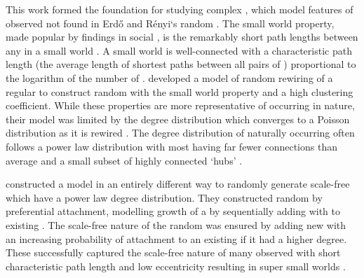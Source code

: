 This work formed the foundation for studying complex  \citep{vanSteen2010}, which model features of observed  not found in Erd\H{o} and R\'enyi`s random  \citep{Erdos1959, Erdos1960}. The \gls{small world} property, made popular by findings in social  \citep{Travers1969}, is the remarkably short path lengths between any  in a \gls{small world} . A \gls{small world}  is well-connected with a characteristic path length (the average length of \glspl{shortest path} between all pairs of ) proportional to the logarithm of the number of . \citet{Watts1998} developed a model of random rewiring of a regular  to construct random  with the \gls{small world} property and a high clustering coefficient. While these properties are more representative of  occurring in nature, their model was limited by the degree distribution which converges to a Poisson distribution as it is rewired \citep{Barrat2000}. 
The  degree distribution of naturally occurring  often follows a power law distribution with most  having far fewer connections than average and a small subset of highly connected  `hubs' \citep{Barabasi1999}.

\citet{Barabasi1999} constructed a  model in an entirely different way to randomly generate \gls{scale-free}  which have a power law degree distribution. They constructed random  by preferential attachment, modelling growth of a  by sequentially adding  with  to existing . The \gls{scale-free} nature of the random  was ensured by adding new  with an increasing probability of attachment to an existing  if it had a higher degree. These  successfully captured the \gls{scale-free} nature of many observed  with short characteristic path length and low eccentricity resulting in super \glspl{small world} \citep{Barabasi1999}. %

